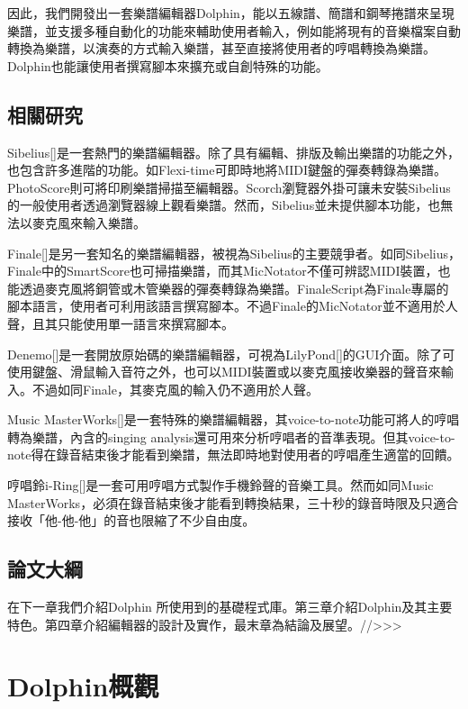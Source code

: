 \documentclass[12pt,a4paper,oneside]{report}
\begin{document}
因此，我們開發出一套樂譜編輯器Dolphin，能以五線譜、簡譜和鋼琴捲譜來呈現樂譜，並支援多種自動化的功能來輔助使用者輸入，例如能將現有的音樂檔案自動轉換為樂譜，以演奏的方式輸入樂譜，甚至直接將使用者的哼唱轉換為樂譜。Dolphin也能讓使用者撰寫腳本來擴充或自創特殊的功能。

\section{相關研究}

Sibelius[]是一套熱門的樂譜編輯器。除了具有編輯、排版及輸出樂譜的功能之外，也包含許多進階的功能。如Flexi-time可即時地將MIDI鍵盤的彈奏轉錄為樂譜。PhotoScore則可將印刷樂譜掃描至編輯器。Scorch瀏覽器外掛可讓未安裝Sibelius的一般使用者透過瀏覽器線上觀看樂譜。然而，Sibelius並未提供腳本功能，也無法以麥克風來輸入樂譜。

Finale[]是另一套知名的樂譜編輯器，被視為Sibelius的主要競爭者。如同Sibelius，Finale中的SmartScore也可掃描樂譜，而其MicNotator不僅可辨認MIDI裝置，也能透過麥克風將銅管或木管樂器的彈奏轉錄為樂譜。FinaleScript為Finale專屬的腳本語言，使用者可利用該語言撰寫腳本。不過Finale的MicNotator並不適用於人聲，且其只能使用單一語言來撰寫腳本。

Denemo[]是一套開放原始碼的樂譜編輯器，可視為LilyPond[]的GUI介面。除了可使用鍵盤、滑鼠輸入音符之外，也可以MIDI裝置或以麥克風接收樂器的聲音來輸入。不過如同Finale，其麥克風的輸入仍不適用於人聲。

Music MasterWorks[]是一套特殊的樂譜編輯器，其voice-to-note功能可將人的哼唱轉為樂譜，內含的singing analysis還可用來分析哼唱者的音準表現。但其voice-to-note得在錄音結束後才能看到樂譜，無法即時地對使用者的哼唱產生適當的回饋。

哼唱鈴i-Ring[]是一套可用哼唱方式製作手機鈴聲的音樂工具。然而如同Music MasterWorks，必須在錄音結束後才能看到轉換結果，三十秒的錄音時限及只適合接收「他-他-他」的音也限縮了不少自由度。

\section{論文大綱}

在下一章我們介紹Dolphin 所使用到的基礎程式庫。第三章介紹Dolphin及其主要特色。第四章介紹編輯器的設計及實作，最末章為結論及展望。//>>>

\chapter{Dolphin概觀}
\end{document}
